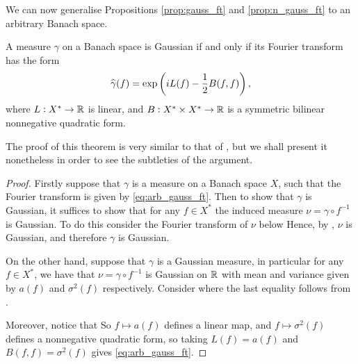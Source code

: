 \documentclass[../main.tex]{subfiles}
\begin{document}
We can now generalise Propositions \ref{prop:gauss_ft} and \ref{prop:n_gauss_ft} to an arbitrary Banach space.

\begin{theorem}
\label{the:arb_gauss_ft}
A measure $\gamma$ on a Banach space is Gaussian if and only if its Fourier transform has the form
\begin{equation}
    \label{eq:arb_gauss_ft}
    \widehat{\gamma}(f) = \exp\left( iL(f)- \frac12 B(f,f) \right),
\end{equation} where $L:X^*\to\operatorname{\mathbb{R}}$ is linear, and $B:X^*\times X^*\to\operatorname{\mathbb{R}}$ is a symmetric bilinear nonnegative quadratic form.
\end{theorem}
The proof of this theorem is very similar to that of , but we shall present it nonetheless in order to see the subtleties of the argument.
\begin{proof}
Firstly suppose that $\gamma$ is a measure on a Banach space $X$, such that the Fourier transform is given by \eqref{eq:arb_gauss_ft}. Then to show that $\gamma$ is Gaussian, it suffices to show that for any $f\in X^*$ the induced measure $\nu = \gamma\circ f^{-1}$ is Gaussian. To do this consider the Fourier transform of $\nu$ below  Hence, by , $\nu$ is Gaussian, and therefore $\gamma$ is Gaussian.

On the other hand, suppose that $\gamma$ is a Gaussian measure, in particular for any $f\in X^*$, we have that $\nu = \gamma\circ f^{-1}$ is Gaussian on $\operatorname{\mathbb{R}}$ with mean and variance given by $a(f)$ and $\sigma^2(f)$ respectively. Consider  where the last equality follows from .

Moreover, notice that  So $f\mapsto a(f)$ defines a linear map, and $f\mapsto \sigma^2(f)$ defines a nonnegative quadratic form, so taking $L(f) = a(f)$ and $B(f,f) = \sigma^2(f)$ gives \eqref{eq:arb_gauss_ft}.
\end{proof}
\end{document}
